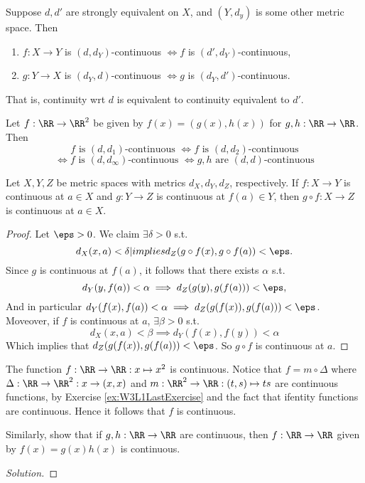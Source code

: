 \begin{corollary}
  Suppose $d,d'$ are strongly equivalent on $X$, and $(Y,d_y)$ is some other
  metric space. Then
  \begin{enumerate}
    \item $f:X\to Y$ is $(d,d_Y)$-continuous $\iff f$ is $(d',d_Y)$-continuous,
    \item $g:Y\to X$ is $(d_Y,d)$-continuous $\iff g$  is $(d_Y,d')$-continuous.
  \end{enumerate}
  That is, continuity wrt $d$ is equivalent to continuity equivalent to $d'$.
  \label{<+label+>}
\end{corollary}
\begin{corollary}
  Let $f:\RR\to\RR^2$ be given by $f(x)=(g(x),h(x))$ for $g,h:\RR\to\RR$. Then
  \[f \text{ is $(d,d_1)$-continuous }\iff f \text{ is $(d,d_2)$-continuous} \]
  \[\iff f \text{ is $(d,d_{\infty})$-continuous }\iff g,h \text{ are $(d,d)$-continuous} \]
  \label{<+label+>}
\end{corollary}

\begin{proposition}
  Let $X,Y,Z$ be metric spaces with metrics $d_X,d_Y,d_Z$, respectively. If
  $f:X\to Y$ is continuous at $a\in X$ and $g:Y\to Z$ is continuous at $f(a)\in
  Y$, then $g\circ f:X\to Z$ is continuous at $a\in X$.
  \label{<+label+>}
\end{proposition}
\begin{proof}
  Let $\eps>0$. We claim $\exists \delta>0$ s.t. 
  \[d_X(x,a)<\delta |implies d_Z(g\circ f (x), g\circ f (a)) <\eps.\]
  Since $g$ is continuous at $f(a)$, it follows that there exists $\alpha$ s.t.
  \[d_Y(y,f(a))<\alpha \implies d_Z(g(y), g(f(a))) < \eps,\]
  And in particular $d_Y(f(x),f(a))<\alpha \implies d_Z(g(f(x)),g(f(a)))<\eps$.
  Moveover, if $f$ is continuous at $a$, $\exists \beta>0$ s.t. 
  \[d_X(x,a)<\beta \implies d_Y(f(x),f(y))<\alpha\]
  Which implies that $d_Z(g(f(x)),g(f(a)))<\eps$. So $g\circ f$ is continuous at
  $a$.
\end{proof}

\begin{example}
  The function $f:\RR\to\RR:x\mapsto x^2$ is continuous. Notice that
  $f=m\circ\Delta$ where $\Delta:\RR\to\RR^2:x\to (x,x)$ and $m:\RR^2\to
  \RR:(t,s)\mapsto ts$ are continuous functions, by Exercise
  \ref{ex:W3L1LastExercise} and the fact that ifentity functions are continuous.
  Hence it follows that $f$ is continuous.
\end{example}
\begin{exercise}
  Similarly, show that if $g,h:\RR\to\RR$ are continuous, then $f:\RR\to\RR$
  given by $f(x)=g(x)h(x)$ is continuous.
\end{exercise}
\begin{proof}[Solution]
  
\end{proof}
